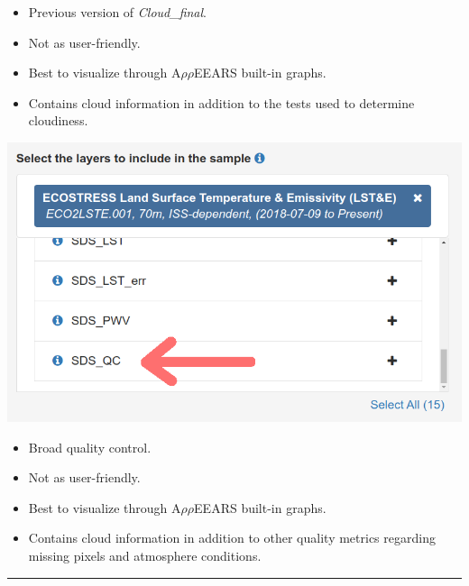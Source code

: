 \documentclass[oneside,a4paper,11pt,explicit]{book}
\begin{document}
\begin{tcbraster}[raster columns=3, raster equal height, raster column skip=-.5mm]
\begin{tcolorbox}[colback=yellow!5!white,colframe=IceCreamLeaf, colbacktitle=IceCreamLeaf,title=SDS\_CloudMask]
\begin{center}
			\end{center}
			\begin{itemize}[leftmargin=*]
				\item Previous version of \textit{Cloud\_final}.
				\item Not as user-friendly.
				\item Best to visualize through A$\rho\rho$EEARS built-in graphs.
				\item Contains cloud information in addition to the tests used to determine cloudiness.
			\end{itemize}
		\end{tcolorbox}
		\begin{tcolorbox}[colback=yellow!5!white,colframe=IceCreamLeaf,
			colbacktitle=IceCreamLeaf,title=SDS\_QC]
			\begin{center}
				\includegraphics[width=\columnwidth]{SDS_QC.png}
			\end{center}
			\begin{itemize}[leftmargin=*]
				\item Broad quality control.
				\item Not as user-friendly.
				\item Best to visualize through A$\rho\rho$EEARS built-in graphs.
				\item Contains cloud information in addition to other quality metrics regarding missing pixels and atmosphere conditions.
			\end{itemize}
		\end{tcolorbox}
	\end{tcbraster}
	
	\vspace{.25em}
	
	\hrule
	
\end{document}
